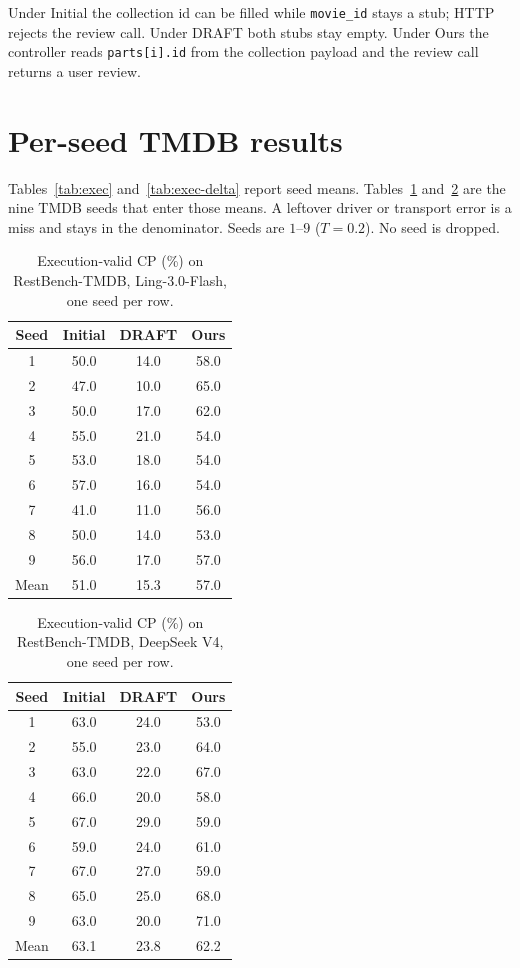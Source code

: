 \documentclass[11pt,a4paper]{article}
\begin{document}
Under Initial the collection id can be filled while \texttt{movie\_id} stays a stub; HTTP rejects the review call. Under DRAFT both stubs stay empty. Under Ours the controller reads \texttt{parts[i].id} from the collection payload and the review call returns a user review.

\section{Per-seed TMDB results}
\label{app:seeds}

Tables~\ref{tab:exec} and~\ref{tab:exec-delta} report seed means. Tables~\ref{tab:seed-ling} and~\ref{tab:seed-flash} are the nine TMDB seeds that enter those means. A leftover driver or transport error is a miss and stays in the denominator. Seeds are $1$--$9$ ($T{=}0.2$). No seed is dropped.

\begin{table}[H]
\centering
\caption{Execution-valid CP (\%) on RestBench-TMDB, Ling-3.0-Flash, one seed per row.}
\label{tab:seed-ling}
\small
\begin{tabular}{cccc}
\toprule
Seed & Initial & DRAFT & Ours \\
\midrule
1 & 50.0 & 14.0 & 58.0 \\
2 & 47.0 & 10.0 & 65.0 \\
3 & 50.0 & 17.0 & 62.0 \\
4 & 55.0 & 21.0 & 54.0 \\
5 & 53.0 & 18.0 & 54.0 \\
6 & 57.0 & 16.0 & 54.0 \\
7 & 41.0 & 11.0 & 56.0 \\
8 & 50.0 & 14.0 & 53.0 \\
9 & 56.0 & 17.0 & 57.0 \\
\midrule
Mean & 51.0 & 15.3 & 57.0 \\
\bottomrule
\end{tabular}
\end{table}

\begin{table}[H]
\centering
\caption{Execution-valid CP (\%) on RestBench-TMDB, DeepSeek V4, one seed per row.}
\label{tab:seed-flash}
\small
\begin{tabular}{cccc}
\toprule
Seed & Initial & DRAFT & Ours \\
\midrule
1 & 63.0 & 24.0 & 53.0 \\
2 & 55.0 & 23.0 & 64.0 \\
3 & 63.0 & 22.0 & 67.0 \\
4 & 66.0 & 20.0 & 58.0 \\
5 & 67.0 & 29.0 & 59.0 \\
6 & 59.0 & 24.0 & 61.0 \\
7 & 67.0 & 27.0 & 59.0 \\
8 & 65.0 & 25.0 & 68.0 \\
9 & 63.0 & 20.0 & 71.0 \\
\midrule
Mean & 63.1 & 23.8 & 62.2 \\
\bottomrule
\end{tabular}
\end{table}
\end{document}
